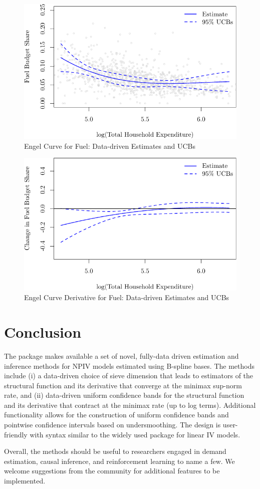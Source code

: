 \documentclass[
]{jss}
\begin{document}
\begin{figure}
\centering
\includegraphics{npiv_files/figure-latex/fuel-dd-1.pdf}
\caption{Engel Curve for Fuel: Data-driven Estimates and UCBs}
\end{figure}

\begin{figure}
\centering
\includegraphics{npiv_files/figure-latex/fuel-dd-deriv-1.pdf}
\caption{Engel Curve Derivative for Fuel: Data-driven Estimates and
UCBs}
\end{figure}

\section{Conclusion}\label{conclusion}

The package  makes available a set of novel, fully-data driven
estimation and inference methods for NPIV models estimated using
B-spline bases. The methods include (i) a data-driven choice of sieve
dimension that leads to estimators of the structural function and its
derivative that converge at the minimax sup-norm rate, and (ii)
data-driven uniform confidence bands for the structural function and its
derivative that contract at the minimax rate (up to log terms).
Additional functionality allows for the construction of uniform
confidence bands and pointwise confidence intervals based on
undersmoothing. The design is user-friendly with syntax similar to the
widely used package  \citep{IVREG} for linear IV models.

Overall, the methods should be useful to researchers engaged in demand
estimation, causal inference, and reinforcement learning to name a few.
We welcome suggestions from the community for additional features to be
implemented.


\end{document}
